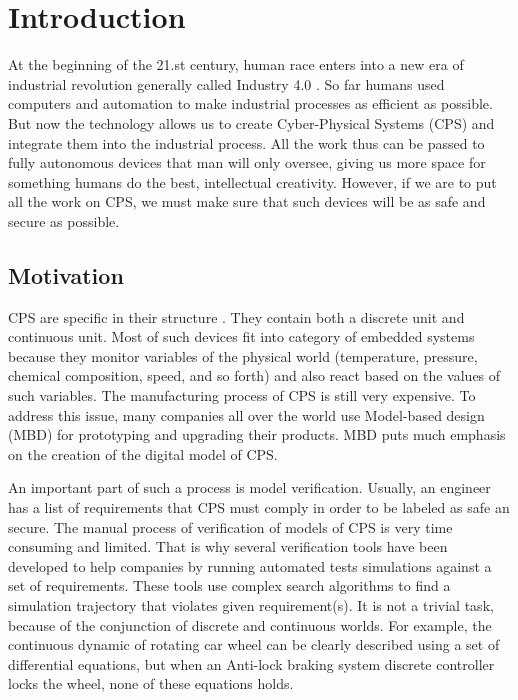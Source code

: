 \chapter{Introduction}
\enlargethispage*{5pt}

At the beginning of the 21.st century, human race enters into a new era of industrial revolution generally called Industry 4.0 \cite{Xu:Industry4.0}. So far humans used computers and automation to make industrial processes as efficient as possible. But now the technology allows us to create Cyber-Physical Systems (CPS) and integrate them into the industrial process. All the work thus can be passed to fully autonomous devices that man will only oversee, giving us more space for something humans do the best, intellectual creativity. However, if we are to put all the work on CPS, we must make sure that such devices will be as safe and secure as possible.

\section{Motivation}
CPS are specific in their structure \cite{Florence:CPSspecification}. They contain both a discrete unit and continuous unit. Most of such devices fit into category of embedded systems because they monitor variables of the physical world (temperature, pressure, chemical composition, speed, and so forth) and also react based on the values of such variables. The manufacturing process of CPS is still very expensive. To address this issue, many companies all over the world use Model-based design (MBD) for prototyping and upgrading their products. MBD puts much emphasis on the creation of the digital model of CPS.

An important part of such a process is model verification. Usually, an engineer has a list of requirements that CPS must comply in order to be labeled as safe an secure. The manual process of verification of models of CPS is very time consuming and limited. That is why several verification tools have been developed to help companies by running automated tests simulations against a set of requirements. These tools use complex search algorithms to find a simulation trajectory that violates given requirement(s). It is not a trivial task, because of the conjunction of discrete and continuous worlds. For example, the continuous dynamic of rotating car wheel can be clearly described using a set of differential equations, but when an Anti-lock braking system discrete controller locks the wheel, none of these equations holds.

